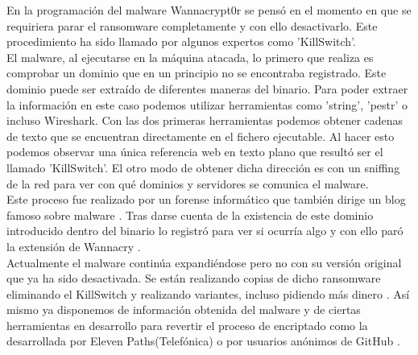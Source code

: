En la programación del malware Wannacrypt0r se pensó en el momento en que se requiriera parar el ransomware completamente y con ello desactivarlo. Este procedimiento ha sido llamado por algunos expertos como 'KillSwitch'.\\
El malware, al ejecutarse en la máquina atacada, lo primero que realiza es comprobar un dominio que en un principio no se encontraba registrado. Este dominio puede ser extraído de diferentes maneras del binario. Para poder extraer la información en este caso podemos utilizar herramientas como 'string', 'pestr' o incluso Wireshark. Con las dos primeras herramientas podemos obtener cadenas de texto que se encuentran directamente en el fichero ejecutable. Al hacer esto podemos observar una única referencia web en texto plano que resultó ser el llamado 'KillSwitch'. El otro modo de obtener dicha dirección es con un sniffing de la red para ver con qué dominios y servidores se comunica el malware.\\
Este proceso fue realizado por un forense informático que también dirige un blog famoso sobre malware \cite{killswitch-situacion-2}. Tras darse cuenta de la existencia de este dominio introducido dentro del binario lo registró para ver si ocurría algo y con ello paró la extensión de Wannacry \cite{killswitch-situacion-1}.\\
Actualmente el malware continúa expandiéndose pero no con su versión original que ya ha sido desactivada. Se están realizando copias de dicho ransomware eliminando el KillSwitch y realizando variantes, incluso pidiendo más dinero \cite{killswitch-situacion-3}. Así mismo ya disponemos de información obtenida del malware \cite{killswitch-situacion-4} y de ciertas herramientas en desarrollo para revertir el proceso de encriptado como la desarrollada por Eleven Paths(Telefónica) \cite{killswitch-situacion-5} o por usuarios anónimos de GitHub \cite{killswitch-situacion-6}.